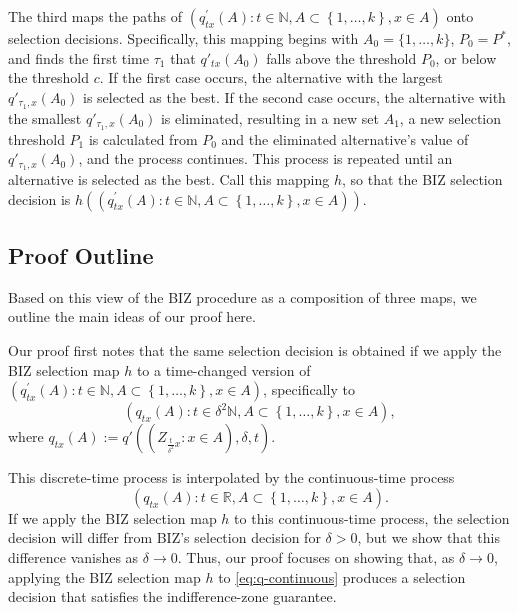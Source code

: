 \documentclass{wscpaperproc}
\theoremstyle{wsc}
\begin{document}
The third maps the paths of $\left(q_{tx}^{'}\left(A\right):t\in\mathbb{N},A\subset\left\{ 1,\ldots,k\right\} ,x\in A\right)$
onto selection decisions. Specifically, this mapping begins with $A_0 = \{1,\ldots,k\}$,
$P_0=P^*$, 
and finds the first time $\tau_1$ that $q'_{tx}(A_0)$ falls above the threshold $P_0$,
or below the threshold $c$.
If the first case occurs, the alternative with the largest $q'_{\tau_1,x}(A_0)$ is selected as the best.
If the second case occurs, the alternative with the smallest
$q'_{\tau_1,x}(A_0)$ is eliminated, resulting in a new set $A_1$, a new selection threshold 
$P_1$ is calculated from $P_0$ and the eliminated alternative's value of $q'_{\tau_1,x}(A_0)$, and the process continues.
This process is repeated until an alternative is selected as the best.
Call this mapping $h$, so that the BIZ selection decision is
$h\left(\left(q_{tx}^{'}\left(A\right):t\in\mathbb{N},A\subset\left\{ 1,\ldots,k\right\} ,x\in A\right)\right)$.

\subsection{Proof Outline}
Based on this view of the BIZ procedure as a composition of three maps, we outline the main ideas of our proof here. 

Our proof first notes that the same selection decision is obtained if we apply
the BIZ selection map $h$ to a time-changed version of 
$\left(q_{tx}^{'}\left(A\right):t\in\mathbb{N},A\subset\left\{ 1,\ldots,k\right\} ,x\in A\right)$, specifically to 
\begin{equation*}
\left(q_{tx}\left(A\right):t\in\delta^2 \mathbb{N},A\subset\left\{ 1,\ldots,k\right\} ,x\in A\right),
\end{equation*}
where
$q_{tx}\left(A\right) := q'\left(\left(Z_{\frac{t}{\delta^{2}}x}:x\in A\right),\delta,t \right)$.

This discrete-time process is interpolated by the continuous-time process 
\begin{equation}
\left(q_{tx}\left(A\right):t\in\mathbb{R},A\subset\left\{ 1,\ldots,k\right\} ,x\in A\right).
\label{eq:q-continuous}
\end{equation}
If we apply the BIZ selection map $h$ to this continuous-time process, the selection decision will differ from BIZ's selection decision for $\delta>0$, but we show that this difference vanishes as $\delta\to0$.  Thus, our proof focuses on showing that, as $\delta\to0$, applying the BIZ selection map $h$ to \eqref{eq:q-continuous} produces a selection decision that satisfies the indifference-zone guarantee. 
\end{document}

